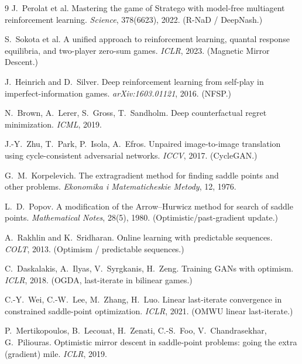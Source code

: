 \documentclass[10pt,twocolumn]{article}
\theoremstyle{plain}
\theoremstyle{remark}
\begin{document}
\begin{thebibliography}{9}
\small
{}
J.~Perolat et al.
\newblock Mastering the game of Stratego with model-free multiagent
reinforcement learning.
\newblock \emph{Science}, 378(6623), 2022. (R-NaD / DeepNash.)

S.~Sokota et al.
\newblock A unified approach to reinforcement learning, quantal response
equilibria, and two-player zero-sum games.
\newblock \emph{ICLR}, 2023. (Magnetic Mirror Descent.)

J.~Heinrich and D.~Silver.
\newblock Deep reinforcement learning from self-play in imperfect-information
games.
\newblock \emph{arXiv:1603.01121}, 2016. (NFSP.)

N.~Brown, A.~Lerer, S.~Gross, T.~Sandholm.
\newblock Deep counterfactual regret minimization.
\newblock \emph{ICML}, 2019.

J.-Y.~Zhu, T.~Park, P.~Isola, A.~Efros.
\newblock Unpaired image-to-image translation using cycle-consistent
adversarial networks.
\newblock \emph{ICCV}, 2017. (CycleGAN.)

G.~M.~Korpelevich.
\newblock The extragradient method for finding saddle points and other problems.
\newblock \emph{Ekonomika i Matematicheskie Metody}, 12, 1976.

L.~D.~Popov.
\newblock A modification of the Arrow--Hurwicz method for search of saddle points.
\newblock \emph{Mathematical Notes}, 28(5), 1980. (Optimistic/past-gradient update.)

A.~Rakhlin and K.~Sridharan.
\newblock Online learning with predictable sequences.
\newblock \emph{COLT}, 2013. (Optimism / predictable sequences.)

C.~Daskalakis, A.~Ilyas, V.~Syrgkanis, H.~Zeng.
\newblock Training GANs with optimism.
\newblock \emph{ICLR}, 2018. (OGDA, last-iterate in bilinear games.)

C.-Y.~Wei, C.-W.~Lee, M.~Zhang, H.~Luo.
\newblock Linear last-iterate convergence in constrained saddle-point optimization.
\newblock \emph{ICLR}, 2021. (OMWU linear last-iterate.)

P.~Mertikopoulos, B.~Lecouat, H.~Zenati, C.-S.~Foo, V.~Chandrasekhar, G.~Piliouras.
\newblock Optimistic mirror descent in saddle-point problems: going the extra
(gradient) mile.
\newblock \emph{ICLR}, 2019.


\end{thebibliography}
\end{document}
